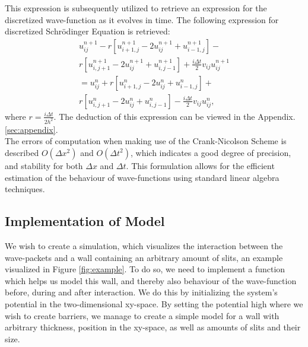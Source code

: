 \documentclass[10pt, nofootinbib, twocolumn]{revtex4-1}
\begin{document}
This expression is subsequently utilized to retrieve an expression for the discretized wave-function as it evolves in time. The following expression for discretized Schrödinger Equation is retrieved: 
\begin{equation}\label{eq:wave}
    \begin{split}
        u_{ij}^{n+1}  -  r \left[u_{i+1,j}^{n+1} - 2u_{ij}^{n+1} + u_{i-1,j}^{n+1}\right]  - \\
        r \left[u_{i,j+1}^{n+1} - 2u_{ij}^{n+1} + u_{i,j-1}^{n+1}\right]  +  \frac{i \Delta t}{2} v_{ij} u_{ij}^{n+1} \\
        = u_{ij}^n  +  r \left[u_{i+1,j}^n - 2u_{ij}^n + u_{i-1,j}^n\right]  +  \\ 
        r \left[u_{i,j+1}^n - 2u_{ij}^n + u_{i,j-1}^n\right]  -  \frac{i \Delta t}{2} v_{ij} u_{ij}^n,
    \end{split}
\end{equation}
where $r = \frac{i \Delta t}{2 h^2}$. The deduction of this expression can be viewed in the Appendix. \ref{sec:appendix}. \\

The errors of computation when making use of the Crank-Nicolson Scheme is described \cite[p. ~312]{notes} $O(\Delta x^2)$ and $O(\Delta t^2)$, which indicates a good degree of precision, and stability for both $\Delta x$ and $\Delta t$. This formulation allows for the efficient estimation of the behaviour of wave-functions using standard linear algebra techniques. \\


\subsection{Implementation of Model}\label{sec:implementation}
We wish to create a simulation, which visualizes the interaction between the wave-packets and a wall containing an arbitrary amount of slits, an example visualized in Figure \ref{fig:example}. To do so, we need to implement a function which helps us model this wall, and thereby also behaviour of the wave-function before, during and after interaction. We do this by initializing the system's potential in the two-dimensional xy-space. By setting the potential high where we wish to create barriers, we manage to create a simple model for a wall with arbitrary thickness, position in the xy-space, as well as amounts of slits and their size. \\
\end{document}
